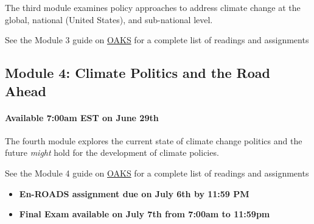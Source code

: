 The third module examines policy approaches to address climate change at
the global, national (United States), and sub-national level.

\vspace{0.1in}

\noindent See the Module 3 guide on \href{https://lms.cofc.edu}{OAKS}
for a complete list of readings and assignments

\hypertarget{module-4-climate-politics-and-the-road-ahead}{%
\subsection{Module 4: Climate Politics and the Road
Ahead}\label{module-4-climate-politics-and-the-road-ahead}}

\hypertarget{available-700am-est-on-june-29th}{%
\paragraph{Available 7:00am EST on June
29th}\label{available-700am-est-on-june-29th}}

The fourth module explores the current state of climate change politics
and the future \emph{might} hold for the development of climate
policies.

\vspace{0.1in}

\noindent See the Module 4 guide on \href{https://lms.cofc.edu}{OAKS}
for a complete list of readings and assignments

\begin{itemize}
\item
  \textbf{En-ROADS assignment due on July 6th by 11:59 PM}
\item
  \textbf{Final Exam available on July 7th from 7:00am to 11:59pm}
\end{itemize}

